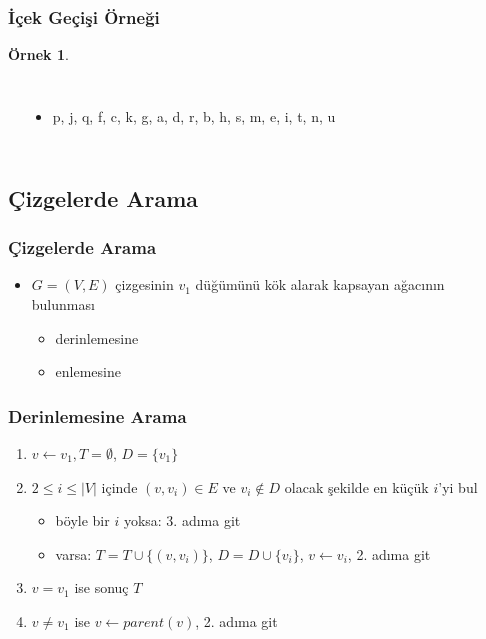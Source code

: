 \documentclass[dvipsnames]{beamer}
\theoremstyle{definition}
\theoremstyle{example}
\newtheorem{ornek}[theorem]{Örnek}
\theoremstyle{plain}
\begin{document}
\begin{frame}
  \frametitle{İçek Geçişi Örneği}

  \begin{ornek}
    \begin{columns}
      \begin{center}
      \end{center}

      \pause
      \begin{itemize}
        \item p, j, q, f, c, k, g, a, d, r, b, h, s, m, e, i, t, n, u
      \end{itemize}
    \end{columns}
  \end{ornek}
\end{frame}

\subsection{Çizgelerde Arama}

\begin{frame}
  \frametitle{Çizgelerde Arama}

  \begin{itemize}
    \item $G=(V,E)$ çizgesinin $v_1$ düğümünü kök alarak kapsayan ağacının
      bulunması
    \begin{itemize}
      \item derinlemesine
      \item enlemesine
    \end{itemize}
  \end{itemize}
\end{frame}

\begin{frame}
  \frametitle{Derinlemesine Arama}

  \begin{enumerate}
    \item $v \leftarrow v_1, T=\emptyset$, $D=\{v_1\}$

    \pause
    \item $2 \leq i \leq |V|$ içinde $(v,v_i) \in E$ ve $v_i \notin D$
      olacak şekilde en küçük $i$'yi bul
      \begin{itemize}
        \item böyle bir $i$ yoksa: 3. adıma git
        \item varsa: $T=T \cup \{(v,v_i)\}$, $D=D \cup \{v_i\}$,
          $v \leftarrow v_i$, 2. adıma git
      \end{itemize}

    \pause
    \item $v=v_1$ ise sonuç $T$

    \pause
    \item $v \neq v_1$ ise $v \leftarrow parent(v)$, 2. adıma git
  \end{enumerate}
\end{frame}
\end{document}
